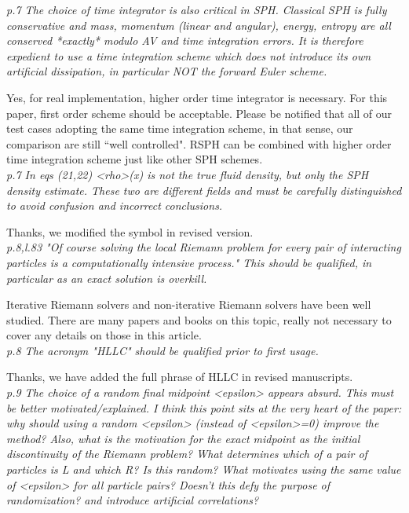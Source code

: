 \documentclass[10pt,a4paper]{article}
\begin{document}
\textit{p.7 The choice of time integrator is also critical in SPH. Classical SPH is fully conservative and mass, momentum (linear and angular), energy, entropy are all conserved *exactly* modulo AV and time integration errors. It is therefore expedient to use a time integration scheme which does not introduce its own artificial dissipation, in particular NOT the forward Euler scheme.}

Yes, for real implementation, higher order time integrator is necessary. For this paper, first order scheme should be acceptable. Please be notified that all of our test cases adopting the same time integration scheme, in that sense, our comparison are still ``well controlled". RSPH can be combined with higher order time integration scheme just like other SPH schemes.
\\[3pt]

\textit{p.7 In eqs (21,22) <rho>(x) is not the true fluid density, but only the SPH density estimate. These two are different fields and must be carefully distinguished to avoid confusion and incorrect conclusions.}

Thanks, we modified the symbol in revised version.
\\[3pt]

\textit{p.8,l.83 "Of course solving the local Riemann problem for every pair of interacting particles is a computationally intensive process." This should be qualified, in particular as an exact solution is overkill.}

Iterative Riemann solvers and non-iterative Riemann solvers have been well studied. There are many papers \citep[][e.g.]{roe1981approximate} and books \citep[][e.g.]{toro2013riemann} on this topic, really not necessary to cover any details on those in this article.
\\[3pt]

\textit{p.8 The acronym "HLLC" should be qualified prior to first usage.}

Thanks, we have added the full phrase of HLLC in revised manuscripts.
\\[3pt]

\textit{p.9 The choice of a random final midpoint <epsilon> appears absurd. This must be better motivated/explained. I think this point sits at the very heart of the paper: why should using a random <epsilon> (instead of <epsilon>=0) improve the method?
Also, what is the motivation for the exact midpoint as the initial discontinuity of the Riemann problem? What determines which of a pair of particles is L and which R? Is this random? What motivates using the same value of <epsilon> for all particle pairs? Doesn't this defy the purpose of randomization? and introduce artificial correlations?}
\end{document}
